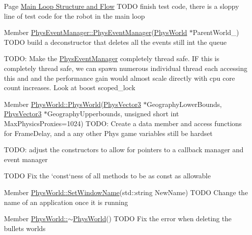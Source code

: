 \label{todo__todo000012}
\hypertarget{todo__todo000012}{}
 
\begin{DoxyDescription}
\item[Page \hyperlink{mainloop1}{Main Loop Structure and Flow} ]TODO finish test code, there is a sloppy line of test code for the robot in the main loop 
\end{DoxyDescription}

\label{todo__todo000006}
\hypertarget{todo__todo000006}{}
 
\begin{DoxyDescription}
\item[Member \hyperlink{classPhysEventManager_a1355f36d99de303cec6f3b27cadaa9ff}{PhysEventManager::PhysEventManager}(\hyperlink{classPhysWorld}{PhysWorld} $\ast$ParentWorld\_\-) ]TODO build a deconstructor that deletes all the events still int the queue 

TODO: Make the \hyperlink{classPhysEventManager}{PhysEventManager} completely thread safe. IF this is completely thread safe, we can spawn numerous individual thread each accessing this and and the performance gain would almost scale directly with cpu core count increases. Look at boost scoped\_\-lock 
\end{DoxyDescription}

\label{todo__todo000015}
\hypertarget{todo__todo000015}{}
 
\begin{DoxyDescription}
\item[Member \hyperlink{classPhysWorld_a3228c98369082139722d3c918d735e6c}{PhysWorld::PhysWorld}(\hyperlink{classPhysVector3}{PhysVector3} $\ast$GeographyLowerBounds, \hyperlink{classPhysVector3}{PhysVector3} $\ast$GeographyUpperbounds, unsigned short int MaxPhysicsProxies=1024) ]TODO: Create a data member and access functions for FrameDelay, and a any other Phys game variables still be hardset 

TODO: adjust the constructors to allow for pointers to a callback manager and event manager 

TODO Fix the `const`ness of all methods to be as const as allowable 
\end{DoxyDescription}

\label{todo__todo000014}
\hypertarget{todo__todo000014}{}
 
\begin{DoxyDescription}
\item[Member \hyperlink{classPhysWorld_adb5ba2b5a3140c5d7033d3180e3f7342}{PhysWorld::SetWindowName}(std::string NewName) ]TODO Change the name of an application once it is running 
\end{DoxyDescription}

\label{todo__todo000011}
\hypertarget{todo__todo000011}{}
 
\begin{DoxyDescription}
\item[Member \hyperlink{classPhysWorld_acdfe3b4c1c236860dc7dff945cfe5b07}{PhysWorld::$\sim$PhysWorld}() ]TODO Fix the error when deleting the bullets worlds 
\end{DoxyDescription}